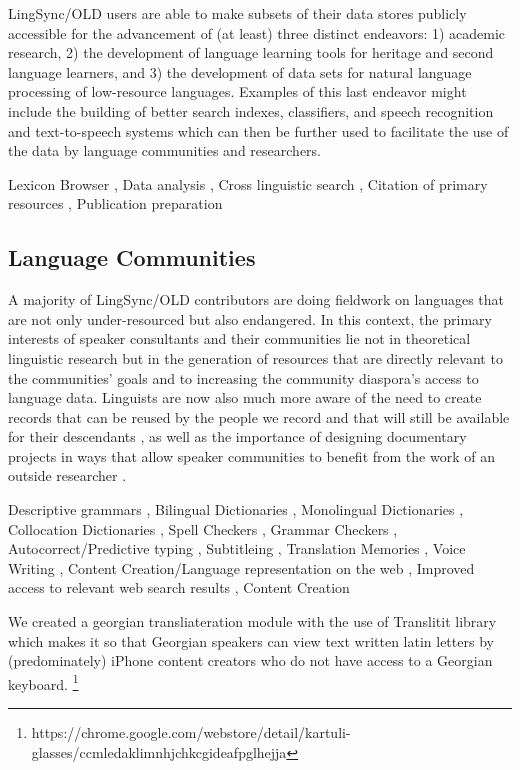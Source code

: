 \documentclass[11pt]{article}
\begin{document}
LingSync/OLD users are able to make subsets of their data stores publicly
accessible for the advancement of (at least) three distinct endeavors: 1)
academic research, 2) the development of language learning tools for
heritage and second language learners, and 3) the development of data sets for
natural language processing of low-resource languages. Examples of this last
endeavor might include the building of better search indexes, classifiers,
and speech recognition and text-to-speech systems which can then be further
used to facilitate the use of the data by language communities and researchers.

	 Lexicon Browser
	, Data analysis
	, Cross linguistic search
	, Citation of primary resources
	, Publication preparation

\subsection{Language Communities}

A majority of LingSync/OLD contributors are doing fieldwork on languages that
are not only under-resourced but also endangered. In this context, the primary
interests of speaker consultants and their communities lie not in theoretical
linguistic research but in the generation of resources that are directly
relevant to the communities' goals and to increasing the community diaspora's
access to language data. Linguists are now also much more aware of the need to
create records that can be reused by the people we record and that will still be
available for their descendants \cite[p.129]{Thieberger:2012}, as well as the
importance of designing documentary projects in ways that allow speaker
communities to benefit from the work of an outside researcher \cite{Good:2012}.


	 Descriptive grammars
	, Bilingual Dictionaries 
	, Monolingual Dictionaries
	, Collocation Dictionaries
	, Spell Checkers
	, Grammar Checkers
	, Autocorrect/Predictive typing
	, Subtitleing
	, Translation Memories
	, Voice Writing
	, Content Creation/Language representation on the web
	, Improved access to relevant web search results
	, Content Creation

We created a georgian transliateration module with the use of Translitit library which makes it so that Georgian speakers can view text written latin letters by (predominately) iPhone content creators who do not have access to a Georgian keyboard. \footnote{https://chrome.google.com/webstore/detail/kartuli-glasses/ccmledaklimnhjchkcgideafpglhejja}
\end{document}
